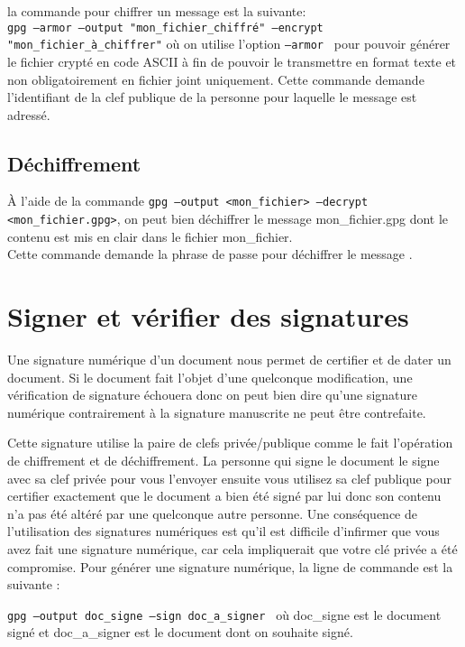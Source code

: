 la commande pour chiffrer un message est la suivante:\\
\texttt{gpg --armor --output "mon\_fichier\_chiffré" --encrypt "mon\_fichier\_à\_chiffrer"}
où on utilise l'option \texttt{--armor } pour pouvoir générer le fichier crypté en code ASCII à fin de pouvoir le transmettre en 
format texte et non obligatoirement en fichier joint uniquement.
Cette commande demande l'identifiant de la clef publique de la personne pour laquelle le message est adressé.


\subsection {Déchiffrement}
À l'aide de la commande \texttt{gpg --output <mon\_fichier> --decrypt <mon\_fichier.gpg>}, on peut bien déchiffrer le message 
mon\_fichier.gpg dont le contenu est mis en clair dans le fichier  mon\_fichier.\\

Cette commande demande la phrase de passe pour déchiffrer le message .


\section {Signer et vérifier des signatures}

Une signature numérique d'un document nous permet de certifier et de dater un document. Si le document fait l'objet d'une quelconque
modification, une vérification de signature échouera donc on peut bien dire qu'une signature numérique contrairement à la signature 
manuscrite ne peut être contrefaite.

Cette signature utilise la paire de clefs privée/publique comme le fait l'opération de chiffrement et de déchiffrement.
La personne qui signe le document le signe avec sa clef privée pour vous l'envoyer ensuite vous utilisez sa clef publique
pour certifier exactement que le document a bien été signé par lui donc son contenu n'a pas été altéré par une quelconque 
autre personne. Une conséquence de l'utilisation des signatures numériques est qu'il est difficile d'infirmer que vous avez fait
une signature numérique, car cela impliquerait que votre clé privée a été compromise.
Pour générer une signature numérique, la ligne de commande est la suivante :

\texttt{gpg --output doc\_signe --sign doc\_a\_signer } où doc\_signe est le document signé et doc\_a\_signer est le document 
dont on souhaite signé.\\
 
